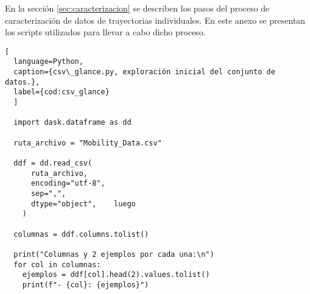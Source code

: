 \label{anexo:scripts}

En la sección \ref{sec:caracterizacion} se describen los pasos del proceso de caracterización de datos de trayectorias individuales. En este anexo se presentan los scripts utilizados para llevar a cabo dicho proceso.

\begin{lstlisting}[
  language=Python,
  caption={csv\_glance.py, exploración inicial del conjunto de datos.},
  label={cod:csv_glance}
  ]

  import dask.dataframe as dd

  ruta_archivo = "Mobility_Data.csv"  

  ddf = dd.read_csv(
      ruta_archivo,
      encoding="utf-8",  
      sep=",",          
      dtype="object",    luego
    )

  columnas = ddf.columns.tolist()

  print("Columnas y 2 ejemplos por cada una:\n")
  for col in columnas:            
    ejemplos = ddf[col].head(2).values.tolist() 
    print(f"- {col}: {ejemplos}")
\end{lstlisting}